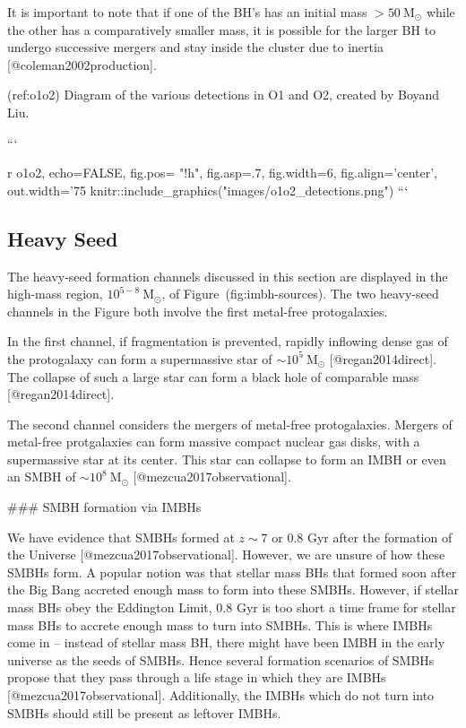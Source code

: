 {{    It is important to note that if one of the BH's has an initial mass
    $>50 \ \text{M}_{\odot}$ while the other has a comparatively smaller
    mass, it is possible for the larger BH to undergo successive mergers
    and stay inside the cluster due to inertia [@coleman2002production].

(ref:o1o2) Diagram of the various detections in O1 and O2, created by Boyand Liu.

```{r o1o2, echo=FALSE, fig.pos= "!h", fig.asp=.7, fig.width=6, fig.align='center', out.width='75%
knitr::include_graphics("images/o1o2_detections.png")
```




\subsection{Heavy Seed}

The heavy-seed formation channels discussed in this section are
displayed in the high-mass region, $10^{5-8} \ \text{M}_{\odot}$, of
Figure~\@ref(fig:imbh-sources). The two heavy-seed channels in the
Figure both involve the first metal-free protogalaxies.

In the first channel, if fragmentation is prevented, rapidly inflowing
dense gas of the protogalaxy can form a supermassive star of  $\sim
10^{5} \ \text{M}_{\odot}$ [@regan2014direct]. The collapse of such a
large star can form a black hole of comparable mass [@regan2014direct].

The second channel considers the mergers of metal-free protogalaxies.
Mergers of metal-free protgalaxies can form massive compact nuclear
gas disks, with a supermassive star at its center. This star can
collapse to form an IMBH or even an SMBH of  $\sim10^{8} \
\text{M}_{\odot}$ [@mezcua2017observational].



### SMBH formation via IMBHs

We have evidence that SMBHs formed at $z\sim7$ or 0.8 Gyr after the
formation of the Universe [@mezcua2017observational]. However, we are
unsure of how these SMBHs form. A popular notion was that stellar mass
BHs that formed soon after the Big Bang accreted enough mass to form
into these SMBHs. However, if stellar mass BHs obey the Eddington
Limit, 0.8 Gyr is too short a time frame for stellar mass BHs to
accrete enough mass to turn into SMBHs. This is where IMBHs come in --
instead of stellar mass BH, there might have been IMBH in the early
universe as the seeds of SMBHs. Hence several formation scenarios of
SMBHs propose that they pass through a life stage in which they are
IMBHs [@mezcua2017observational]. Additionally, the IMBHs which do not
turn into SMBHs should still be present as leftover IMBHs.


}}}
